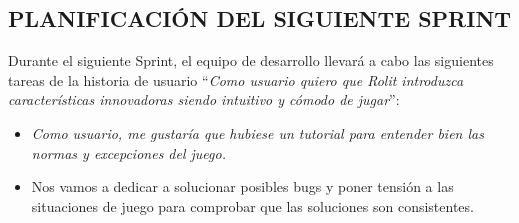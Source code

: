 \documentclass[../../SCRUM.tex]{subfiles}
\begin{document}
\subsection{PLANIFICACIÓN DEL SIGUIENTE SPRINT}
Durante el siguiente Sprint, el equipo de desarrollo llevará a cabo las siguientes tareas de la historia de usuario ``\textit{Como usuario quiero que Rolit introduzca características innovadoras siendo intuitivo y cómodo de jugar}'':
\begin{itemize}
\item \textit{Como usuario, me gustaría que hubiese un tutorial para entender bien las normas y excepciones del juego.}
\item Nos vamos a dedicar a solucionar posibles bugs y poner tensión a las situaciones de juego para comprobar que las soluciones son consistentes.
\end{itemize}
\end{document}
